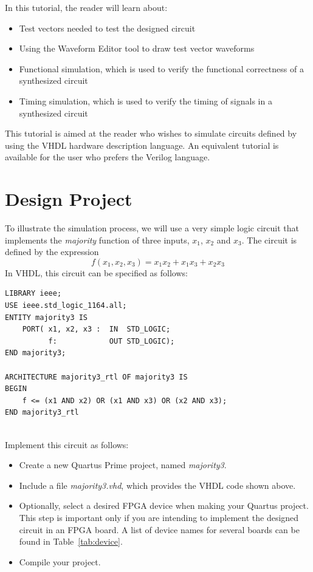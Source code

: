 \documentclass[11pt, twoside, pdftex]{article}
\begin{document}
In this tutorial, the reader will learn about:
\begin{itemize}
\item Test vectors needed to test the designed circuit
\item Using the Waveform Editor tool to draw test vector waveforms
\item Functional simulation, which is used to verify the functional 
correctness of a synthesized circuit
\item Timing simulation, which is used to verify the timing of signals in a synthesized circuit
\end{itemize}

This tutorial is aimed at the reader who wishes to simulate circuits defined
by using the VHDL hardware description language. An equivalent tutorial is
available for the user who prefers the Verilog language.

\section{Design Project}
\label{sec:design_project}
To illustrate the simulation process, we will use a very simple logic circuit that 
implements the {\it majority} function of three inputs, $x_1$, $x_2$ and $x_3$. The circuit
is defined by the expression
$$
f(x_1, x_2, x_3) = x_1 x_2 + x_1 x_3 + x_2 x_3
$$
\noindent
In VHDL, this circuit can be specified as follows:

\lstset{language=VHDL} 
\begin{center}
\begin{lstlisting}
LIBRARY ieee;
USE ieee.std_logic_1164.all;
ENTITY majority3 IS
	PORT( x1, x2, x3 :	IN	STD_LOGIC;
		  f: 			OUT	STD_LOGIC);
END majority3;

ARCHITECTURE majority3_rtl OF majority3 IS
BEGIN
	f <= (x1 AND x2) OR (x1 AND x3) OR (x2 AND x3);
END majority3_rtl
\end{lstlisting}
\end{center}


\noindent
~\\
Implement this circuit as follows:
\begin{itemize}
\item Create a new Quartus Prime project, named {\it majority3}.
\item Include a file {\it majority3.vhd}, which provides the VHDL code shown above.
\item Optionally, select a desired FPGA device when making your Quartus project. This step 
is important only if you are intending to implement the designed circuit in an FPGA board. 
A list of device names for several boards can be found in Table~\ref{tab:device}.
\item Compile your project.
\end{itemize}
\end{document}
